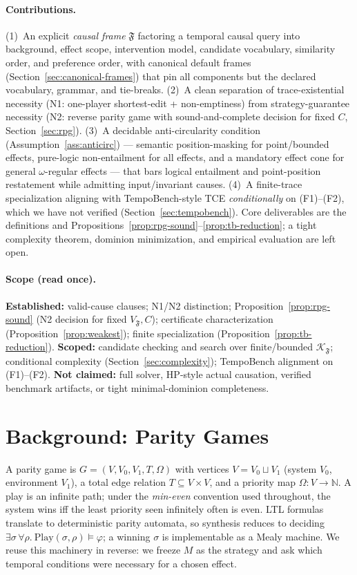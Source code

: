 \documentclass[11pt]{article}
\theoremstyle{remark}
\newcommand{\Nat}{\mathbb{N}}
\newcommand{\Frame}{\mathfrak{F}}
\begin{document}
\paragraph{Contributions.} (1)~An explicit \emph{causal frame} \(\Frame\)
factoring a temporal causal query into background, effect scope, intervention
model, candidate vocabulary, similarity order, and preference order, with
canonical default frames (Section~\ref{sec:canonical-frames}) that pin all
components but the declared vocabulary, grammar, and tie-breaks. (2)~A clean
separation of trace-existential necessity (N1: one-player shortest-edit +
non-emptiness) from strategy-guarantee necessity (N2: reverse parity game with
sound-and-complete decision for fixed \(C\), Section~\ref{sec:rpg}). (3)~A
decidable anti-circularity condition (Assumption~\ref{ass:anticirc}) --- semantic
position-masking for point/bounded effects, pure-logic non-entailment for all
effects, and a mandatory effect cone for general \(\omega\)-regular effects ---
that bars logical entailment and point-position restatement while admitting
input/invariant causes. (4)~A finite-trace specialization aligning with
TempoBench-style TCE \emph{conditionally} on (F1)--(F2), which we have not
verified (Section~\ref{sec:tempobench}). Core deliverables are the definitions
and Propositions~\ref{prop:rpg-sound}--\ref{prop:tb-reduction}; a tight
complexity theorem, dominion minimization, and empirical evaluation are left open.

\paragraph{Scope (read once).} \textbf{Established:} valid-cause clauses; N1/N2
distinction; Proposition~\ref{prop:rpg-sound} (N2 decision for fixed
\(V_{\Frame},C\)); certificate characterization
(Proposition~\ref{prop:weakest}); finite specialization
(Proposition~\ref{prop:tb-reduction}). \textbf{Scoped:} candidate checking and
search over finite/bounded \(\mathcal{K}_{\Frame}\); conditional complexity
(Section~\ref{sec:complexity}); TempoBench alignment on (F1)--(F2).
\textbf{Not claimed:} full solver, HP-style actual causation, verified benchmark
artifacts, or tight minimal-dominion completeness.

\section{Background: Parity Games}
\label{sec:background}

A parity game is \(G=(V,V_0,V_1,T,\Omega)\) with vertices \(V=V_0\sqcup V_1\)
(system \(V_0\), environment \(V_1\)), a total edge relation \(T\subseteq V\times
V\), and a priority map \(\Omega:V\to\Nat\). A play is an infinite path; under the
\emph{min-even} convention used throughout, the system wins iff the least priority
seen infinitely often is even. LTL formulas translate to deterministic parity
automata, so synthesis reduces to deciding \(\exists\sigma\,\forall\rho.\
\mathrm{Play}(\sigma,\rho)\models\varphi\); a winning \(\sigma\) is implementable
as a Mealy machine. We reuse this machinery in reverse: we freeze \(M\) as the
strategy and ask which temporal conditions were necessary for a chosen effect.
\end{document}
